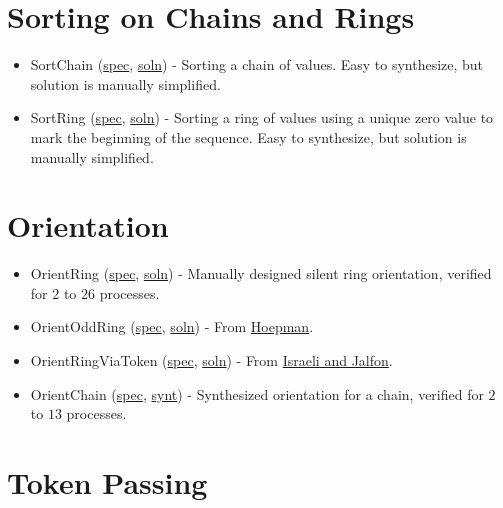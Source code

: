 \section{Sorting on Chains and Rings}

\begin{itemize}
\item SortChain (\href{examplespec/SortChain.prot}{spec}, \href{examplesoln/SortChain.prot}{soln})
- Sorting a chain of values.
Easy to synthesize, but solution is manually simplified.
\item SortRing (\href{examplespec/SortRing.prot}{spec}, \href{examplesoln/SortRing.prot}{soln})
- Sorting a ring of values using a unique zero value to mark the beginning of the sequence.
Easy to synthesize, but solution is manually simplified.
\end{itemize}

\section{Orientation}

\begin{itemize}
\item OrientRing (\href{examplespec/OrientRing.prot}{spec}, \href{examplespec/OrientRing.prot}{soln})
- Manually designed silent ring orientation, verified for $2$ to $26$ processes.
\item OrientOddRing (\href{examplespec/OrientOddRing.prot}{spec}, \href{examplesoln/OrientOddRing.prot}{soln})
- From \href{http://dx.doi.org/10.1007/BFb0020439}{Hoepman}.
\item OrientRingViaToken (\href{examplespec/OrientRingViaToken.prot}{spec}, \href{examplesoln/OrientRingViaToken.prot}{soln})
- From \href{http://dx.doi.org/10.1006/inco.1993.1029}{Israeli and Jalfon}.
\item OrientChain (\href{examplespec/OrientChain.prot}{spec}, \href{examplesynt/OrientChain.prot}{synt})
- Synthesized orientation for a chain, verified for $2$ to $13$ processes.
\end{itemize}

\section{Token Passing}

